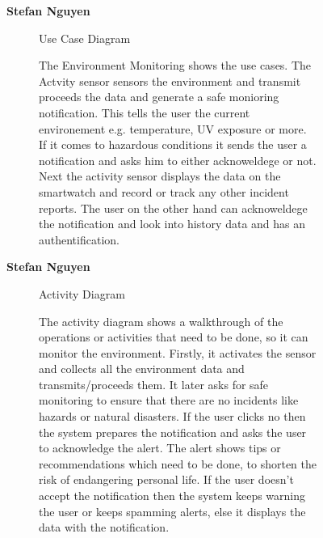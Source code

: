 \documentclass{article}
\begin{document}
	\begin{figure}[htbp]
		\textbf{Stefan Nguyen}
		\centering
		\begin{subfigure}{\textwidth}
			\resizebox{\textwidth}{!}{}
			\caption{Use Case Diagram}
		\end{subfigure}
		\begin{subfigure}{\textwidth}
			The Environment Monitoring shows the use cases. The Actvity sensor sensors the environment and transmit
			proceeds the data and generate a safe monioring notification. This tells the user the current environement e.g.
			temperature, UV exposure or more. If it comes to hazardous conditions it sends the user a notification and asks him 
			to either acknoweldege or not. Next the activity sensor displays the data on the smartwatch and record or
			track any other incident reports. The user on the other hand can acknoweldege the notification and look into
			history data and has an authentification. 
		\end{subfigure}
	\end{figure}
	

	\begin{figure}[htbp]
		\textbf{Stefan Nguyen}
		\centering
		\begin{subfigure}{\textwidth}
			\resizebox{\textwidth}{!}{}
			\caption{Activity Diagram}
		\end{subfigure}
		\begin{subfigure}{\textwidth}
			The activity diagram shows a walkthrough of the operations or activities that need to be done, 
			so it can monitor the environment. Firstly, it activates the sensor and collects all the environment 
			data and transmits/proceeds them. It later asks for safe monitoring to ensure that there are no incidents 
			like hazards or natural disasters. If the user clicks no then the system prepares the notification and 
			asks the user to acknowledge the alert. The alert shows tips or recommendations which need to be done, to 
			shorten the risk of endangering personal life. If the user doesn’t accept the notification then the system 
			keeps warning the user or keeps spamming alerts, else it displays the data with the notification.
		\end{subfigure}
	\end{figure}
	
\end{document}
